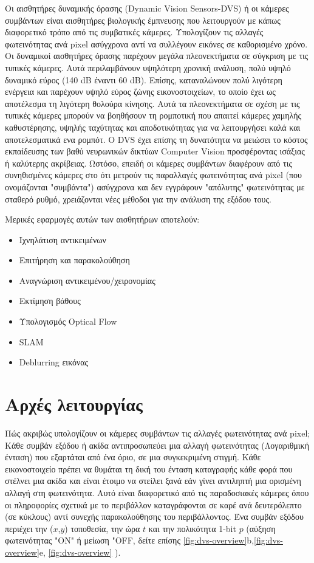 \documentclass[12pt]{report}
\begin{document}
Οι αισθητήρες δυναμικής όρασης (\textlatin{Dynamic Vision Sensors}-\textlatin{DVS}) ή οι κάμερες συμβάντων είναι αισθητήρες βιολογικής έμπνευσης που λειτουργούν με κάπως διαφορετικό τρόπο από τις συμβατικές κάμερες. Υπολογίζουν τις αλλαγές φωτεινότητας ανά \textlatin{pixel} ασύγχρονα αντί να συλλέγουν εικόνες σε καθορισμένο χρόνο. Οι δυναμικοί αισθητήρες όρασης παρέχουν μεγάλα πλεονεκτήματα σε σύγκριση με τις τυπικές κάμερες. Αυτά περιλαμβάνουν υψηλότερη χρονική ανάλυση, πολύ υψηλό δυναμικό εύρος (140 \textlatin{dB} έναντι 60 \textlatin{dB}). Επίσης, καταναλώνουν πολύ λιγότερη ενέργεια και παρέχουν υψηλό εύρος ζώνης εικονοστοιχείων, το οποίο έχει ως αποτέλεσμα τη λιγότερη θολούρα κίνησης. Αυτά τα πλεονεκτήματα σε σχέση με τις τυπικές κάμερες μπορούν να βοηθήσουν τη ρομποτική που απαιτεί κάμερες χαμηλής καθυστέρησης, υψηλής ταχύτητας και αποδοτικότητας για να λειτουργήσει καλά και αποτελεσματικά ενα ρομπότ. Ο \textlatin{DVS} έχει επίσης τη δυνατότητα να μειώσει το κόστος εκπαίδευσης των βαθύ νευρωνικών δικτύων \textlatin{Computer Vision} προσφέροντας ισάξιας ή καλύτερης ακρίβειας. Ωστόσο, επειδή οι κάμερες συμβάντων διαφέρουν από τις συνηθισμένες κάμερες στο ότι μετρούν τις παραλλαγές φωτεινότητας ανά \textlatin{pixel} (που ονομάζονται "συμβάντα") ασύγχρονα και δεν εγγράφουν "απόλυτης" φωτεινότητας με σταθερό ρυθμό, χρειάζονται νέες μέθοδοι για την ανάλυση της εξόδου τους.

Μερικές εφαρμογές αυτών των αισθητήρων αποτελούν:
\begin{itemize}
    \item Ιχνηλάτιση αντικειμένων
    \item Επιτήρηση και παρακολούθηση
    \item Αναγνώριση αντικειμένου/χειρονομίας
    \item Εκτίμηση βάθους 
    \item Υπολογισμός \textlatin{Optical Flow}
    \item \textlatin{SLAM}
    \item \textlatin{Deblurring} εικόνας
\end{itemize}

\section{Αρχές λειτουργίας}

Πώς ακριβώς υπολογίζουν οι κάμερες συμβάντων τις αλλαγές φωτεινότητας ανά \textlatin{ pixel}; Κάθε συμβάν εξόδου ή ακίδα αντιπροσωπεύει μια αλλαγή φωτεινότητας (Λογαριθμική ένταση) που εξαρτάται από ένα όριο, σε μια συγκεκριμένη στιγμή. Κάθε εικονοστοιχείο πρέπει να θυμάται τη δική του ένταση καταγραφής κάθε φορά που στέλνει μια ακίδα και είναι έτοιμο να στείλει ξανά εάν γίνει αντιληπτή μια ορισμένη αλλαγή στη φωτεινότητα. Αυτό είναι διαφορετικό από τις παραδοσιακές κάμερες όπου οι πληροφορίες σχετικά με το περιβάλλον καταγράφονται σε καρέ ανά δευτερόλεπτο (σε κύκλους) αντί συνεχής παρακολούθησης του περιβάλλοντος. Ένα συμβάν εξόδου περιέχει την ($x$,$y$) τοποθεσία, την ώρα $t$ και την πολικότητα 1-\textlatin{bit} $p$ (αύξηση φωτεινότητας "ON" ή μείωση "\textlatin{OFF}, δείτε επίσης \ref{fig:dvs-overview}b,\ref{fig:dvs-overview}e, \ref{fig:dvs-overview} \cite{davis}).
\end{document}
